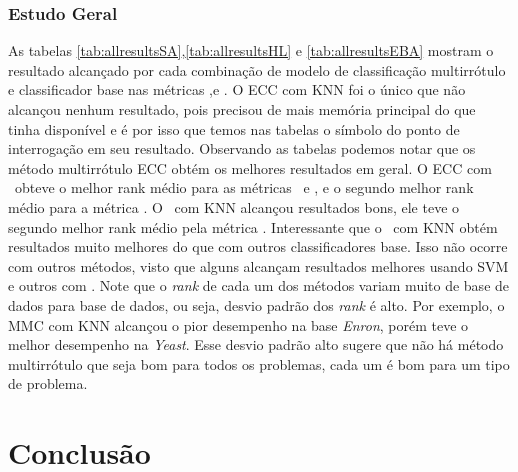 

\subsection{Estudo Geral}






As tabelas \ref{tab:allresultsSA},\ref{tab:allresultsHL} e \ref{tab:allresultsEBA} mostram o  resultado alcançado
por cada combinação de modelo de classificação multirrótulo e classificador base nas métricas \SA,\HL e \EBA.
O ECC com KNN foi o único que não alcançou nenhum resultado, pois precisou de mais memória principal do que
tinha disponível e é por isso que temos nas tabelas o símbolo do ponto de interrogação em seu resultado.
Observando as tabelas podemos notar
que os método multirrótulo ECC obtém os melhores resultados em geral. O ECC com \jqo~obteve o 
melhor rank médio para as métricas \SA~e \HL, e o segundo melhor rank médio para a métrica \EBA.
O \MRLMa~com KNN alcançou resultados bons, ele teve o segundo melhor rank médio pela métrica \SA.
Interessante que o \MRLMa~com KNN obtém resultados muito melhores do que com outros classificadores base.
Isso não ocorre com outros métodos, visto que alguns alcançam resultados melhores usando SVM e outros com \jqo.
Note que o \textit{rank} de cada um dos métodos variam muito de base de dados para base de dados, ou seja, desvio padrão
dos \textit{rank} é alto. Por exemplo, o MMC com KNN alcançou o pior desempenho na base \textit{Enron}, porém 
teve o melhor desempenho na \textit{Yeast}. Esse desvio padrão alto sugere que não há método multirrótulo que
seja bom para todos os problemas, cada um é bom para um tipo de problema.



\chapter{Conclusão}
\label{sec:conclusions}

